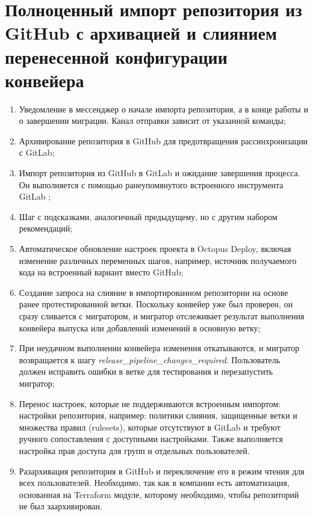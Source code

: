 \section{Полноценный импорт репозитория из GitHub с архивацией и слиянием перенесенной конфигурации конвейера}

\begin{enumerate}
  \item Уведомление в мессенджер о начале импорта репозитория, а в конце работы и о завершении миграции. Канал отправки зависит от указанной команды;
  \item Архивирование репозитория в GitHub для предотвращения рассинхронизации с GitLab;
  \item Импорт репозитория из GitHub в GitLab и ожидание завершения процесса. Он выполняется с помощью ранеупомянутого встроенного инструмента GitLab ;
  \item Шаг с подсказками, аналогичный предыдущему, но с другим набором рекомендаций;
  \item Автоматическое обновление настроек проекта в Octopus Deploy, включая изменение различных переменных шагов, например, источник получаемого кода на встроенный вариант вместо GitHub;
  \item Создание запроса на слияние в импортированном репозитории на основе ранее протестированной ветки. Поскольку конвейер уже был проверен, он сразу сливается с мигратором, и мигратор отслеживает результат выполнения конвейера выпуска или добавлений изменений в основную ветку;
  \item При неудачном выполнении конвейера изменения откатываются, и мигратор возвращается к шагу \emph{release\_pipeline\_changes\_required}. Пользователь должен исправить ошибки в ветке для тестирования и перезапустить мигратор;
  \item Перенос настроек, которые не поддерживаются встроенным импортом: настройки репозитория, например: политики слияния, защищенные ветки и множества правил (rulesets), которые отсутствуют в GitLab и требуют ручного сопоставления с доступными настройками. Также выполняется настройка прав доступа для групп и отдельных пользователей.
  \item Разархивация репозитория в GitHub и переключение его в режим чтения для всех пользователей. Необходимо, так как в компании есть автоматизация, основанная на Terraform модуле, которому необходимо, чтобы репозиторий не был заархивирован.
\end{enumerate}
